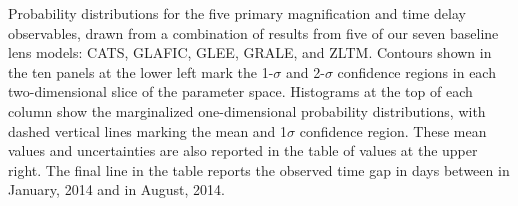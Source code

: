 Probability distributions for the five primary magnification and time
delay observables, drawn from a combination of results from five of
our seven baseline lens models: CATS, GLAFIC, GLEE, GRALE, and ZLTM.
Contours shown in the ten panels at the lower left mark the 1-$\sigma$
and 2-$\sigma$ confidence regions in each two-dimensional slice of the
parameter space. Histograms at the top of each column show the
marginalized one-dimensional probability distributions, with dashed
vertical lines marking the mean and 1$\sigma$ confidence region.
These mean values and uncertainties are also reported in the table of
values at the upper right. The final line in the table reports the
observed time gap in days between \spockone in January, 2014
and \spocktwo in August, 2014.
\label{fig:LensModelContours}
